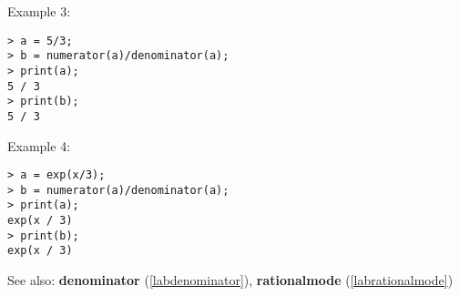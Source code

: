 \noindent Example 3: 
\begin{center}\begin{minipage}{15cm}\begin{Verbatim}[frame=single,commandchars=\\\|\~]
> a = 5/3;
> b = numerator(a)/denominator(a);
> print(a);
5 / 3
> print(b);
5 / 3
\end{Verbatim}
\end{minipage}\end{center}
\noindent Example 4: 
\begin{center}\begin{minipage}{15cm}\begin{Verbatim}[frame=single,commandchars=\\\|\~]
> a = exp(x/3);
> b = numerator(a)/denominator(a);
> print(a);
exp(x / 3)
> print(b);
exp(x / 3)
\end{Verbatim}
\end{minipage}\end{center}
See also: \textbf{denominator} (\ref{labdenominator}), \textbf{rationalmode} (\ref{labrationalmode})
